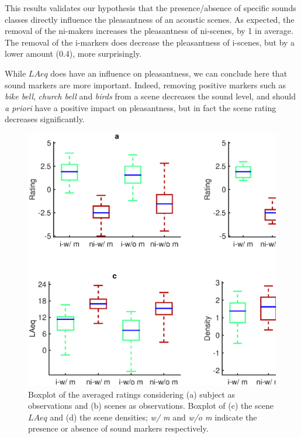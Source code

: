 \documentclass[twoside,twocolumn]{article}
\begin{document}
This results validates our hypothesis that the presence/absence of specific sounds classes directly influence the pleasantness of an acoustic scenes. As expected, the removal of the ni-makers increases the pleasantness of ni-scenes, by 1 in average. The removal of the i-markers does decrease the pleasantness of i-scenes, but by a lower amount (0.4), more surprisingly.

While $LAeq$ does have an influence on pleasantness, we can conclude here that sound markers are more important. Indeed, removing positive markers such as \textit{bike bell}, \textit{church bell} and \textit{birds} from a scene decreases the sound level, and should \emph{a priori} have a positive impact on pleasantness, but in fact the scene rating decreases significantly.
 
\begin{figure}[t]
\begin{center}
\includegraphics[width=\columnwidth]{gfxMatlab/xp4_3.eps}
\caption{\label{fig:xp4_3} Boxplot of the averaged ratings considering (a) subject as observations and (b) scenes as observations. Boxplot of (c) the scene $LAeq$ and (d) the scene densities; \textit{w/ m} and \textit{w/o m} indicate the presence or absence of sound markers respectively.}
\end{center}
\end{figure}
\end{document}
